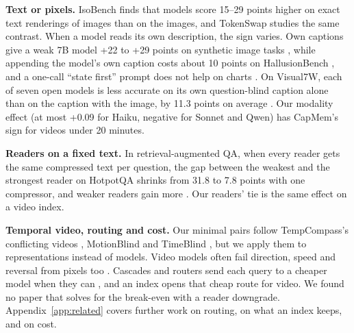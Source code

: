\documentclass[11pt]{article}
\begin{document}
\textbf{Text or pixels.} IsoBench \citep{isobench} finds that models score 15--29 points higher on exact text renderings of images than on the images, and TokenSwap \citep{tokenswap} studies the same contrast. When a model reads its own description, the sign varies. Own captions give a weak 7B model +22 to +29 points on synthetic image tasks \citep{captionthis}, while appending the model's own caption costs about 10 points on HallusionBench \citep{geass}, and a one-call ``state first'' prompt does not help on charts \citep{seeingsolving}. On Visual7W, each of seven open models is less accurate on its own question-blind caption alone than on the caption with the image, by 11.3 points on average \citep{revisitcaption}. Our modality effect (at most +0.09 for Haiku, negative for Sonnet and Qwen) has CapMem's sign for videos under 20 minutes.

\textbf{Readers on a fixed text.} In retrieval-augmented QA, when every reader gets the same compressed text per question, the gap between the weakest and the strongest reader on HotpotQA shrinks from 31.8 to 7.8 points with one compressor, and weaker readers gain more \citep{compressneutral}. Our readers' tie is the same effect on a video index.

\textbf{Temporal video, routing and cost.} Our minimal pairs follow TempCompass's conflicting videos \citep{tempcompass}, MotionBlind \citep{motionblind} and TimeBlind \citep{timeblind}, but we apply them to representations instead of models. Video models often fail direction, speed and reversal from pixels too \citep{whichway,arrowoftime,reversaldrop,t3}. Cascades and routers send each query to a cheaper model when they can \citep{frugalgpt,routellm,safecascade}, and an index opens that cheap route for video. We found no paper that solves for the break-even with a reader downgrade. Appendix~\ref{app:related} covers further work on routing, on what an index keeps, and on cost.
\end{document}
